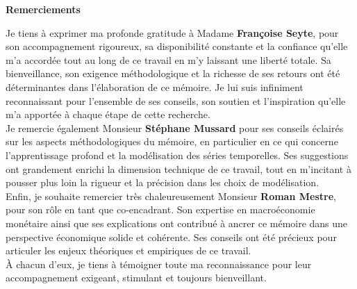 {}

\vspace{3em}

\begin{center}
  {\Huge\bfseries Remerciements}
\end{center}

\vspace{1.5em}

\begin{adjustwidth}{2em}{2em}
\begin{sloppypar}

Je tiens à exprimer ma profonde gratitude à Madame \textbf{Françoise Seyte}, pour son accompagnement rigoureux, sa disponibilité constante et la confiance qu’elle m’a accordée tout au long de ce travail en m'y laissant une liberté totale. Sa bienveillance, son exigence méthodologique et la richesse de ses retours ont été déterminantes dans l’élaboration de ce mémoire. Je lui suis infiniment reconnaissant pour l’ensemble de ses conseils, son soutien et l’inspiration qu’elle m’a apportée à chaque étape de cette recherche.\\

Je remercie également Monsieur \textbf{Stéphane Mussard} pour ses conseils éclairés sur les aspects méthodologiques du mémoire, en particulier en ce qui concerne l’apprentissage profond et la modélisation des séries temporelles. Ses suggestions ont grandement enrichi la dimension technique de ce travail, tout en m’incitant à pousser plus loin la rigueur et la précision dans les choix de modélisation.\\

Enfin, je souhaite remercier très chaleureusement Monsieur \textbf{Roman Mestre}, pour son rôle en tant que co-encadrant. Son expertise en macroéconomie monétaire ainsi que ses explications ont contribué à ancrer ce mémoire dans une perspective économique solide et cohérente. Ses conseils ont été précieux pour articuler les enjeux théoriques et empiriques de ce travail.\\

À chacun d’eux, je tiens à témoigner toute ma reconnaissance pour leur accompagnement exigeant, stimulant et toujours bienveillant.
\end{sloppypar}
\end{adjustwidth}

